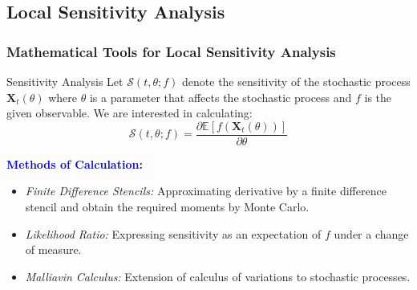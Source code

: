 \documentclass[a4paper,10pt]{beamer}
\newcommand{\BS}[1]{\boldsymbol{#1}}
\newcommand{\E}[1]{\mathbb{E}\left[ #1 \right]}
\newcommand{\rb}[1]{\left( #1 \right)}
\begin{document}
	\begin{frame}
		\subsection{Local Sensitivity Analysis}
		\frametitle{Mathematical Tools for Local Sensitivity Analysis}
		\begin{block}{Sensitivity Analysis}
			Let $\mathcal{S}\rb{t,\theta;f}$ denote the sensitivity of the stochastic process $\BS{X}_{t}\rb{\theta}$ where $\theta$ is a parameter that affects the stochastic process and $f$ is the given observable. We are interested in calculating:
			$$ \mathcal{S}\rb{t,\theta;f} = \frac{\partial \E{f\rb{\BS{X}_{t}\rb{\theta}}}}{\partial \theta}$$
		\end{block}
		\textcolor{blue}{\textbf{Methods of Calculation:}}
		\begin{itemize}
			\item {\textit{{Finite Difference Stencils:}} Approximating derivative by a finite difference stencil and obtain the required moments by Monte Carlo.}
			\item {\textit{{Likelihood Ratio:}} Expressing sensitivity as an expectation of $f$ under a change of measure.}
			\item {\textit{{Malliavin Calculus:}} Extension of calculus of variations to stochastic processes.}
		\end{itemize}
	\end{frame}
	
\end{document}
